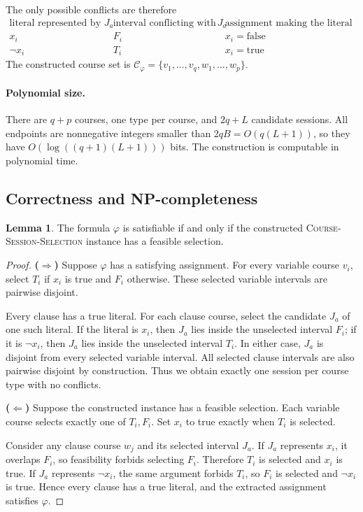 \documentclass[10pt]{article}
\theoremstyle{definition}
\newtheorem{lemma}[definition]{Lemma}
\begin{document}
The only possible conflicts are therefore
\[
  \begin{array}{c|c|c}
    \text{literal represented by }J_a & \text{interval conflicting with }J_a
      & \text{assignment making the literal false} \\
    \hline
    x_i & F_i & x_i=\mathrm{false} \\
    \neg x_i & T_i & x_i=\mathrm{true}
  \end{array}
\]
The constructed course set is
$\mathcal{C}_\varphi=\{v_1,\ldots,v_q,w_1,\ldots,w_p\}$.

\paragraph{Polynomial size.}
There are $q+p$ courses, one type per course, and $2q+L$ candidate
sessions. All endpoints are nonnegative integers smaller than
$2qB=O(q(L+1))$, so they have $O(\log((q+1)(L+1)))$ bits.
The construction is computable in polynomial time.

\subsection{Correctness and NP-completeness}

\begin{lemma}
The formula $\varphi$ is satisfiable if and only if the constructed
\textsc{Course-Session-Selection} instance has a feasible selection.
\end{lemma}

\begin{proof}
\noindent\textbf{($\Rightarrow$)} Suppose $\varphi$ has a satisfying
assignment. For every variable course $v_i$, select $T_i$ if $x_i$ is
true and $F_i$ otherwise. These selected variable intervals are
pairwise disjoint.

Every clause has a true literal. For each clause course, select the
candidate $J_a$ of one such literal. If the literal is $x_i$, then
$J_a$ lies inside the unselected interval $F_i$; if it is $\neg x_i$,
then $J_a$ lies inside the unselected interval $T_i$. In either case,
$J_a$ is disjoint from every selected variable interval. All selected
clause intervals are also pairwise disjoint by construction. Thus we
obtain exactly one session per course type with no conflicts.

\medskip
\noindent\textbf{($\Leftarrow$)} Suppose the constructed instance has
a feasible selection. Each variable course selects exactly one of
$T_i,F_i$. Set $x_i$ to true exactly when $T_i$ is selected.

Consider any clause course $w_j$ and its selected interval $J_a$.
If $J_a$ represents $x_i$, it overlaps $F_i$, so feasibility forbids
selecting $F_i$. Therefore $T_i$ is selected and $x_i$ is true.
If $J_a$ represents $\neg x_i$, the same argument forbids $T_i$,
so $F_i$ is selected and $\neg x_i$ is true. Hence every clause
has a true literal, and the extracted assignment satisfies $\varphi$.
\end{proof}
\end{document}
